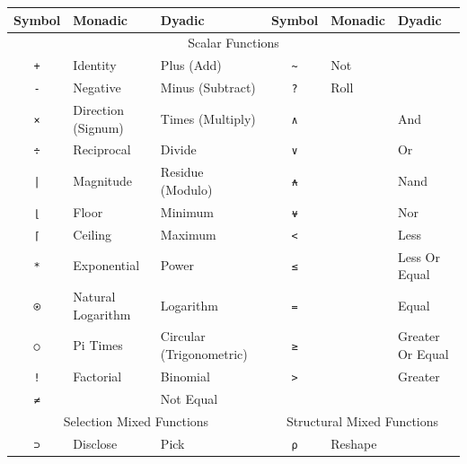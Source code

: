 ﻿\documentclass[numbers,10pt,preprint]{sigplanconf}
\begin{document}



\begin{table}
\centering
\begin{tabular}{cllcll}
\toprule
Symbol                   & Monadic            & Dyadic  &
Symbol                   & Monadic            & Dyadic  \\
\midrule
\multicolumn{6}{c}{Scalar Functions} \\ 
\midrule
\texttt{+}               & Identity           & Plus (Add) &
\texttt{\textasciitilde} & Not                & \\
\texttt{-}               & Negative           & Minus (Subtract) &
\texttt{?}               & Roll               & \\
\texttt{×}               & Direction (Signum) & Times (Multiply) &
\texttt{∧}               &                    & And \\
\texttt{÷}               & Reciprocal         & Divide &
\texttt{∨}               &                    & Or \\
\texttt{|}               & Magnitude          & Residue (Modulo) &
\texttt{⍲}               &                    & Nand \\
\texttt{⌊}               & Floor              & Minimum &
\texttt{⍱}               &                    & Nor \\
\texttt{⌈}               & Ceiling            & Maximum &
\texttt{<}               &                    & Less \\
\texttt{*}               & Exponential        & Power &
\texttt{≤}               &                    & Less Or Equal \\
\texttt{⍟}               & Natural Logarithm  & Logarithm &
\texttt{=}               &                    & Equal \\
\texttt{○}               & Pi Times           & Circular (Trigonometric) &
\texttt{≥}               &                    & Greater Or Equal \\
\texttt{!}               & Factorial          & Binomial &
\texttt{>}               &                    & Greater \\
\texttt{≠}               &                    & Not Equal \\
\midrule
\multicolumn{3}{c}{Selection Mixed Functions} &
\multicolumn{3}{c}{Structural Mixed Functions} \\
\cmidrule(r){1-3} \cmidrule(l){4-6}
\texttt{⊃}               & Disclose & Pick &
\texttt{⍴} & Reshape       & \\

\end{tabular}
\end{table}
\end{document}
